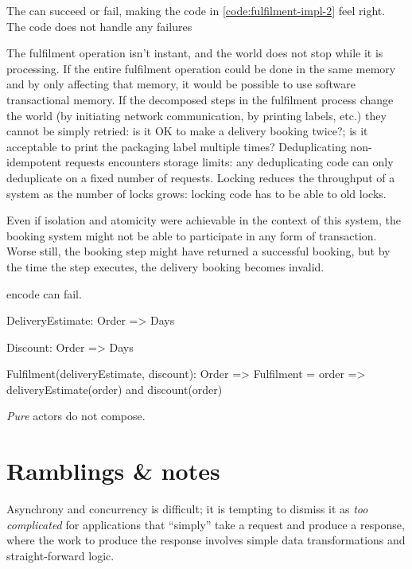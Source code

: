 
The  can succeed or fail, making the code in \autoref{code:fulfilment-impl-2} feel right. The code does not handle any failures

The fulfilment operation isn't instant, and the world does not stop while it is processing. If the entire fulfilment operation could be done in the same memory and by only affecting that memory, it would be possible to use software transactional memory\cite{stm}. If the decomposed steps in the fulfilment process change the world (by initiating network communication, by printing labels, etc.) they cannot be simply retried: is it OK to make a delivery booking twice?; is it acceptable to print the packaging label multiple times? Deduplicating non-idempotent requests encounters storage limits: any deduplicating code can only deduplicate on a fixed number of requests. Locking reduces the throughput of a system as the number of locks grows: locking code has to be able to old locks. 

Even if isolation and atomicity were achievable in the context of this system, the  booking system might not be able to participate in any form of transaction. Worse still, the  booking step might have returned a successful booking, but by the time the  step executes, the delivery booking becomes invalid.

encode can fail.

DeliveryEstimate: Order => Days

Discount: Order => Days

Fulfilment(deliveryEstimate, discount): Order => Fulfilment =
  order =>
    deliveryEstimate(order) and discount(order)

\emph{Pure} actors do not compose. 


\section{Ramblings \& notes}
Asynchrony and concurrency is difficult; it is tempting to dismiss it as \emph{too complicated} for applications that ``simply'' take a request and produce a response, where the work to produce the response involves simple data transformations and straight-forward logic.


